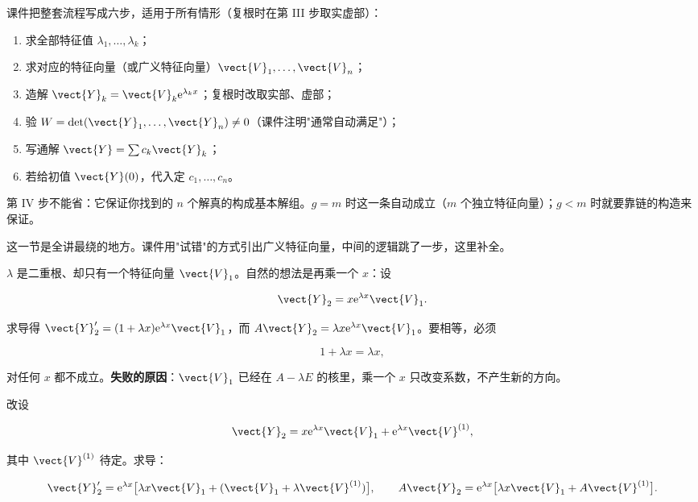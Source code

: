 \documentclass[11pt]{ctexart}
\begin{document}

课件把整套流程写成六步，适用于所有情形（复根时在第 III 步取实虚部）：

\begin{enumerate}
  \item 求全部特征值 $\lambda_1,\dots,\lambda_k$；
  \item 求对应的特征向量（或广义特征向量）$\vect{V}_1,\dots,\vect{V}_n$；
  \item 造解 $\vect{Y}_k=\vect{V}_k\mathrm{e}^{\lambda_kx}$；复根时改取实部、虚部；
  \item 验 $W=\det(\vect{Y}_1,\dots,\vect{Y}_n)\neq0$（课件注明"通常自动满足"）；
  \item 写通解 $\vect{Y}=\sum c_k\vect{Y}_k$；
  \item 若给初值 $\vect{Y}(0)$，代入定 $c_1,\dots,c_n$。
\end{enumerate}

第 IV 步不能省：它保证你找到的 $n$ 个解真的构成基本解组。$g=m$ 时这一条自动成立（$m$ 个独立特征向量）；$g<m$ 时就要靠链的构造来保证。


这一节是全讲最绕的地方。课件用"试错"的方式引出广义特征向量，中间的逻辑跳了一步，这里补全。


$\lambda$ 是二重根、却只有一个特征向量 $\vect{V}_1$。自然的想法是再乘一个 $x$：设

\[
\vect{Y}_2=x\mathrm{e}^{\lambda x}\vect{V}_1 .
\]

求导得 $\vect{Y}_2'=(1+\lambda x)\mathrm{e}^{\lambda x}\vect{V}_1$，而 $A\vect{Y}_2=\lambda x\mathrm{e}^{\lambda x}\vect{V}_1$。要相等，必须

\[
1+\lambda x=\lambda x,
\]

对任何 $x$ 都不成立。\textbf{失败的原因}：$\vect{V}_1$ 已经在 $A-\lambda E$ 的核里，乘一个 $x$ 只改变系数，不产生新的方向。


改设

\[
\vect{Y}_2=x\mathrm{e}^{\lambda x}\vect{V}_1+\mathrm{e}^{\lambda x}\vect{V}^{(1)},
\]

其中 $\vect{V}^{(1)}$ 待定。求导：

\[
\vect{Y}_2'=\mathrm{e}^{\lambda x}\bigl[\lambda x\vect{V}_1+(\vect{V}_1+\lambda\vect{V}^{(1)})\bigr],
\qquad
A\vect{Y}_2=\mathrm{e}^{\lambda x}\bigl[\lambda x\vect{V}_1+A\vect{V}^{(1)}\bigr].
\]
\end{document}
